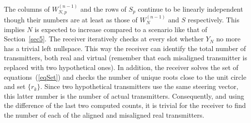 \documentclass[10pt, a4paper, twocolumn]{IEEEtran}
\begin{document}
\noindent The columns of $W_{N,p}^{(n-1)}$ and the rows of $S_p$ continue to be linearly independent though their numbers are at least as those of $W_N^{(n-1)}$ and $S$ respectively. This implies $N$ is expected to increase compared to a scenario like that of Section~\ref{sec5}. The receiver iteratively checks at every slot whether $Y_N$ no more has a trivial left nullspace. This way the receiver can identify the total number of transmitters, both real and virtual (remember that each misaligned transmitter is replaced with two hypothetical ones). In addition, the receiver solves the set of equations~(\ref{eqSet}) and checks the number of unique roots close to the unit circle and set $\{r_k\}$. Since two hypothetical transmitters use the same steering vector, this latter number is the number of actual transmitters. Consequently, and using the difference of the last two computed counts, it is trivial for the receiver to find the number of each of the aligned and misaligned real transmitters.\\
\end{document}
